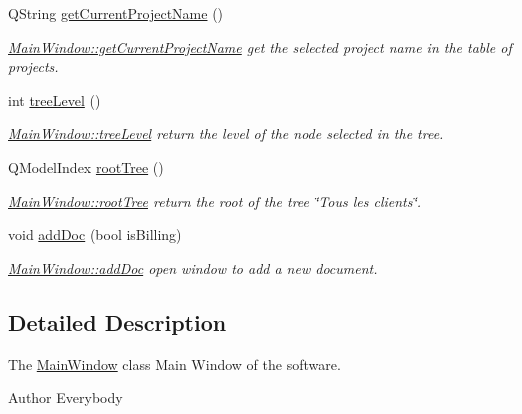 \begin{DoxyCompactItemize}
Q\-String \hyperlink{classGui_1_1MainWindow_af83b009038b41bc676d15cb9bcfd5a39}{get\-Current\-Project\-Name} ()
\begin{DoxyCompactList}\small\item\em \hyperlink{classGui_1_1MainWindow_af83b009038b41bc676d15cb9bcfd5a39}{Main\-Window\-::get\-Current\-Project\-Name} get the selected project name in the table of projects. \end{DoxyCompactList}\item 
int \hyperlink{classGui_1_1MainWindow_a382370c8f119d99d409b1b5708a3e846}{tree\-Level} ()
\begin{DoxyCompactList}\small\item\em \hyperlink{classGui_1_1MainWindow_a382370c8f119d99d409b1b5708a3e846}{Main\-Window\-::tree\-Level} return the level of the node selected in the tree. \end{DoxyCompactList}\item 
Q\-Model\-Index \hyperlink{classGui_1_1MainWindow_ad2b58d18473d125b431ee0974c905748}{root\-Tree} ()
\begin{DoxyCompactList}\small\item\em \hyperlink{classGui_1_1MainWindow_ad2b58d18473d125b431ee0974c905748}{Main\-Window\-::root\-Tree} return the root of the tree \char`\"{}\-Tous les
clients\char`\"{}. \end{DoxyCompactList}\item 
void \hyperlink{classGui_1_1MainWindow_adf04c63032d4014163797ca73041511f}{add\-Doc} (bool is\-Billing)
\begin{DoxyCompactList}\small\item\em \hyperlink{classGui_1_1MainWindow_adf04c63032d4014163797ca73041511f}{Main\-Window\-::add\-Doc} open window to add a new document. \end{DoxyCompactList}\end{DoxyCompactItemize}


\subsection{Detailed Description}
The \hyperlink{classGui_1_1MainWindow}{Main\-Window} class Main Window of the software. 

\begin{DoxyAuthor}{Author}
Everybody 
\end{DoxyAuthor}



